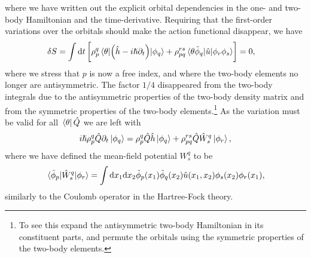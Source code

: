             where we have written out the explicit orbital dependencies in the
            one- and two-body Hamiltonian and the time-derivative.
            Requiring that the first-order variations over the orbitals should
            make the action functional disappear, we have
            \begin{align}
                \delta S
                &=
                \int\dd t \left[ 
                    \rho^{q}_{p}
                    \mel*{\theta}{
                        \left( 
                            \hat{h}
                            - i\hslash\partial_t
                         \right)
                    }{\phi_q}
                    +
                    \rho^{rs}_{pq}
                    \mel*{\theta\tilde{\phi}_q}{
                        \hat{u}
                    }{\phi_r\phi_s}
                 \right]
                = 0,
            \end{align}
            where we stress that $p$ is now a free index, and where the two-body
            elements no longer are antisymmetric.
            The factor $1/4$ disappeared from the two-body integrals due to the
            antisymmetric properties of the two-body density matrix and from the
            symmetric properties of the two-body elements.\footnote{%
                To see this expand the antisymmetric two-body Hamiltonian in its
                constituent parts, and permute the orbitals using the symmetric
                properties of the two-body elements.
            }
            As the variation must be valid for all $\bra*{\theta}\hat{Q}$ we are
            left with
            \begin{align}
                i\hslash\rho^{q}_{p}\hat{Q}\partial_t\ket*{\phi_q}
                = \rho^{q}_{p}\hat{Q}\hat{h}\ket*{\phi_q}
                + \rho^{rs}_{pq}\hat{Q}\hat{W}^{q}_{s}\ket*{\phi_{r}},
                \label{eq:ket-q}
            \end{align}
            where we have defined the mean-field potential $W^{q}_{s}$ to be
            \cite{kvaal2012ab}
            \begin{align}
                \mel*{\tilde{\phi}_p}{
                    \hat{W}^{q}_{s}
                }{\phi_r}
                = \int\dd x_1 \dd x_2
                \tilde{\phi}_{p}(x_1)
                \tilde{\phi}_{q}(x_2)
                \hat{u}(x_1, x_2)
                \phi_s(x_2)
                \phi_r(x_1),
            \end{align}
            similarly to the Coulomb operator in the Hartree-Fock theory.
